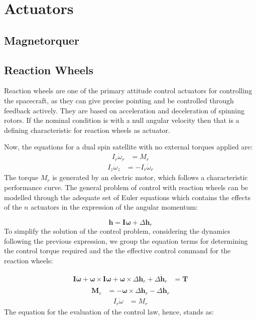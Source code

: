 \section{Actuators}

\subsection{Magnetorquer}
\subsection{Reaction Wheels}

Reaction wheels are one of the primary attitude control actuators for controlling the spacecraft, as they can give precise pointing and be controlled through feedback actively. They are based on acceleration and deceleration of spinning rotors. If the nominal condition is with a null angular velocity then that is a defining characteristic for reaction wheels as actuator.

Now, the equations for a dual spin satellite with no external torques applied are:
     \begin{align*}
		  I_{r}\dot{\omega}_{r} &= M_{r}
     \end{align*}
     \begin{align*}
	    I_{z}\dot{\omega}_{z} &= -I_{r}\dot{\omega}_{r}
     \end{align*}
The torque \( M_{r} \) is generated by an electric motor, which follows a characteristic performance curve. The general problem of control with reaction wheels can be modelled through the adequate set of Euler equations which contains the effects of the \( n \) actuators in the expression of the angular momentum:

    \begin{equation*}
		\mathbf{h} = \boldsymbol{I} \boldsymbol{\omega} + \Delta \mathbf{h}_r
    \end{equation*}	
To simplify the solution of the control problem, considering the dynamics following the previous expression, we group the equation terms for determining the control torque required and the the effective control command for the reaction wheels:

	\begin{align*}
	\boldsymbol{I} \dot{\boldsymbol{\omega}} + \boldsymbol{\omega} \times \boldsymbol{I} \boldsymbol{\omega} + \boldsymbol{\omega} \times \Delta \mathbf{h}_r + \Delta \dot{\mathbf{h}}_r &= \mathbf{T} 
	\end{align*}
	\begin{align*}
		\mathbf{M}_c &= -\boldsymbol{\omega} \times \Delta \mathbf{h}_r - \Delta \dot{\mathbf{h}}_r
	\end{align*}
	\begin{align*}
			I_r \dot{{\omega}} &= {M}_r 
	\end{align*}
The equation for the evaluation of the control law, hence, stands as:
	
